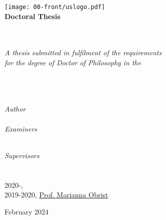 \thispagestyle{empty}
{}
\begin{center}
	\texttt{[image: 00-front/uslogo.pdf]}\\[1cm]%

	\textbf{\Large Doctoral Thesis}

	\Huge \textbf{\myTitle}\\[0.5cm] %
	\large \textbf{\mySubtitle}\\[2cm]
	\large \textit{A thesis submitted in fulfilment of the requirements\\ for the degree of Doctor of Philosophy} %
	\textit{in the}\\[1.2cm]
	\myDepartment\\ \myFaculty\\ \myUni\\[0.4cm]
	\vspace*{0.25cm}
	\begin{minipage}[t]{.39\linewidth}
		\begin{flushleft} %
		\emph{Author}\\
		\href{\myNameLink}{\myName}\\
		\emph{Examiners}\\
		\href{https://scholar.google.co.uk/citations?user=XUfk6ekAAAAJ&hl=en&oi=ao}{\myFirstExaminer} 		\\
		\href{https://scholar.google.com/citations?user=4k-k6SEAAAAJ&hl=en&oi=ao}{\mySecondExaminer}
		\end{flushleft}
	\end{minipage}
	\begin{minipage}[t]{.59\linewidth}
		\begin{flushright} %
		\emph{Supervisors}\\
		\href{https://scholar.google.com/citations?user=66uLtDEAAAAJ&hl=en&oi=ao}{\myFirstSupervisor} 			\\
		\href{https://scholar.google.com/citations?user=JJd597sAAAAJ&hl=en&oi=ao}{\mySecondSupervisor} 	\\
		2020-, \href{https://scholar.google.com/citations?user=7PaqoJcAAAAJ&hl=en&oi=ao}{\myThirdSupervisor} 	\\
		2019-2020, \href{https://scholar.google.com/citations?user=yN-L6cIAAAAJ&hl=en&oi=ao}{Prof. Marianna Obrist} 
		\end{flushright}
	\end{minipage}
	\vfill
	\large {} February 2024
\end{center}